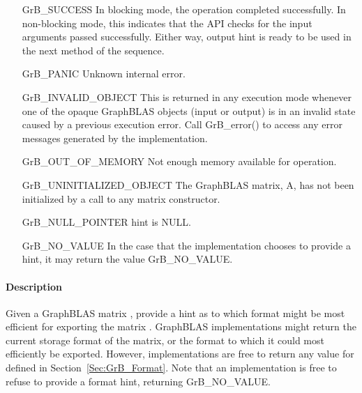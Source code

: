 \begin{itemize}[leftmargin=2.3in]
    \item[{\sf GrB\_SUCCESS}]         In blocking mode, the operation completed
    successfully. In non-blocking mode, this indicates that the API checks 
    for the input arguments passed successfully. Either way, output
    {\sf hint} is ready to be used in the next method of the sequence.

    \item[{\sf GrB\_PANIC}]           Unknown internal error.
    
    \item[{\sf GrB\_INVALID\_OBJECT}] This is returned in any execution mode 
    whenever one of the opaque GraphBLAS objects (input or output) is in an invalid 
    state caused by a previous execution error.  Call {\sf GrB\_error()} to access 
    any error messages generated by the implementation.

    \item[{\sf GrB\_OUT\_OF\_MEMORY}] Not enough memory available for operation.
    
    \item[{\sf GrB\_UNINITIALIZED\_OBJECT}]  The GraphBLAS matrix, {\sf A}, has 
    not been initialized by a call to any matrix constructor.
    
    \item[{\sf GrB\_NULL\_POINTER}]  {\sf hint} is {\sf NULL}.

    \item[{\sf GrB\_NO\_VALUE}]  In the case that the implementation chooses to
    provide a hint, it may return the value {\sf GrB\_NO\_VALUE}.
\end{itemize}

\paragraph{Description}

Given a GraphBLAS matrix , provide a hint as to which format might be most
efficient for exporting the matrix .  GraphBLAS implementations might
return the current storage format of the matrix, or the format to which it could
most efficiently be exported.  However, implementations are free to return any
value for  defined in Section~\ref{Sec:GrB_Format}.  Note that an
implementation is free to refuse to provide a format hint, returning
{\sf GrB\_NO\_VALUE}.



